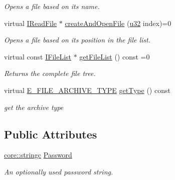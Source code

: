 \begin{DoxyCompactItemize}
\begin{DoxyCompactList}\small\item\em Opens a file based on its name. \end{DoxyCompactList}\item 
virtual \hyperlink{classirr_1_1io_1_1IReadFile}{I\+Read\+File} $\ast$ \hyperlink{classirr_1_1io_1_1IFileArchive_ab6bc8fbd660bbbe42b4d30a9d4f26c7d}{create\+And\+Open\+File} (\hyperlink{namespaceirr_a0416a53257075833e7002efd0a18e804}{u32} index)=0
\begin{DoxyCompactList}\small\item\em Opens a file based on its position in the file list. \end{DoxyCompactList}\item 
virtual const \hyperlink{classirr_1_1io_1_1IFileList}{I\+File\+List} $\ast$ \hyperlink{classirr_1_1io_1_1IFileArchive_a73c683318837b13d16843373da00ded3}{get\+File\+List} () const =0
\begin{DoxyCompactList}\small\item\em Returns the complete file tree. \end{DoxyCompactList}\item 
\mbox{\label{classirr_1_1io_1_1IFileArchive_ae991b223b7f3b8b47916d82d842e3004}} 
virtual \hyperlink{namespaceirr_1_1io_adb3e3c445ec8e608ed1f0f93306da14f}{E\+\_\+\+F\+I\+L\+E\+\_\+\+A\+R\+C\+H\+I\+V\+E\+\_\+\+T\+Y\+PE} \hyperlink{classirr_1_1io_1_1IFileArchive_ae991b223b7f3b8b47916d82d842e3004}{get\+Type} () const
\begin{DoxyCompactList}\small\item\em get the archive type \end{DoxyCompactList}\end{DoxyCompactItemize}
\subsection*{Public Attributes}
\begin{DoxyCompactItemize}
\item 
\hyperlink{namespaceirr_1_1core_ab26a0e0359206b5a694f35c37c829d7f}{core\+::stringc} \hyperlink{classirr_1_1io_1_1IFileArchive_ae5b574864226b09c70518e163e59b6ba}{Password}
\begin{DoxyCompactList}\small\item\em An optionally used password string. \end{DoxyCompactList}\end{DoxyCompactItemize}
